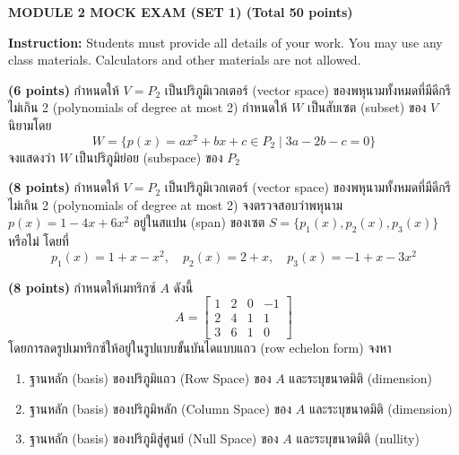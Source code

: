 ﻿\documentclass[12pt, a4paper]{exam}
\begin{document}
\newpage
\begin{center}
    \textbf{\Large MODULE 2 MOCK EXAM (SET 1) (Total 50 points)}
\end{center}
\vspace{0.2cm}
\noindent \textbf{Instruction:} Students must provide all details of your work. You may use any class materials. Calculators and other materials are not allowed.
\vspace{0.5cm}

\begin{questions}
\setcounter{question}{0}

\question \textbf{(6 points)} กำหนดให้ $V = P_2$ เป็นปริภูมิเวกเตอร์ (vector space) ของพหุนามทั้งหมดที่มีดีกรีไม่เกิน 2 (polynomials of degree at most 2) กำหนดให้ $W$ เป็นสับเซต (subset) ของ $V$ นิยามโดย
\[
W = \{p(x) = ax^2 + bx + c \in P_2 \mid 3a - 2b - c = 0\}
\]
จงแสดงว่า $W$ เป็นปริภูมิย่อย (subspace) ของ $P_2$

\question \textbf{(8 points)} กำหนดให้ $V = P_2$ เป็นปริภูมิเวกเตอร์ (vector space) ของพหุนามทั้งหมดที่มีดีกรีไม่เกิน 2 (polynomials of degree at most 2) จงตรวจสอบว่าพหุนาม $p(x) = 1 - 4x + 6x^2$ อยู่ในสแปน (span) ของเซต $S = \{p_1(x), p_2(x), p_3(x)\}$ \mbox{หรือไม่} โดยที่
\[
p_1(x) = 1 + x - x^2, \quad p_2(x) = 2 + x, \quad p_3(x) = -1 + x - 3x^2
\]
\newpage

\question \textbf{(8 points)} กำหนดให้เมทริกซ์ $A$ ดังนี้
\[
A = \begin{bmatrix} 1 & 2 & 0 & -1 \\ 2 & 4 & 1 & 1 \\ 3 & 6 & 1 & 0 \end{bmatrix}
\]
โดยการลดรูปเมทริกซ์ให้อยู่ในรูปแบบขั้นบันไดแบบแถว (row echelon form) จงหา
\begin{enumerate}[label=(\alph*)]
    \item ฐานหลัก (basis) ของปริภูมิแถว (Row Space) ของ $A$ และระบุขนาดมิติ (dimension)
    \item ฐานหลัก (basis) ของปริภูมิหลัก (Column Space) ของ $A$ และระบุขนาดมิติ (dimension)
    \item ฐานหลัก (basis) ของปริภูมิสู่ศูนย์ (Null Space) ของ $A$ และระบุขนาดมิติ (nullity)
\end{enumerate}


\end{questions}
\end{document}
